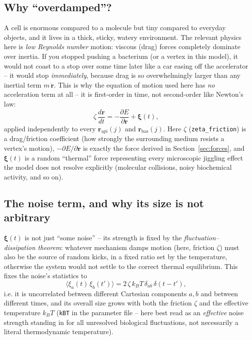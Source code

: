 \documentclass[11pt,a4paper]{report}
\newcommand{\rvec}{\mathbf{r}}
\begin{document}
\subsection{Why ``overdamped''?}
A cell is enormous compared to a molecule but tiny compared to
everyday objects, and it lives in a thick, sticky, watery environment.
The relevant physics here is \emph{low Reynolds number} motion: viscous
(drag) forces completely dominate over inertia. If you stopped pushing
a bacterium (or a vertex in this model), it would not coast to a stop
over some time later like a car easing off the accelerator -- it would
stop \emph{immediately}, because drag is so overwhelmingly larger than
any inertial term $m\,\ddot{\rvec}$. This is why the equation of motion
used here has \emph{no} acceleration term at all -- it is first-order
in time, not second-order like Newton's law:
\begin{equation}
  \zeta \,\frac{d\rvec}{dt} = -\frac{\partial E}{\partial \rvec} + \boldsymbol{\xi}(t),
  \label{eq:langevin}
\end{equation}
applied independently to every $\rvec_{\mathrm{api}}(j)$ and
$\rvec_{\mathrm{bas}}(j)$. Here $\zeta$ (\texttt{zeta\_friction}) is a
drag/friction coefficient (how strongly the surrounding medium resists
a vertex's motion), $-\partial E/\partial\rvec$ is exactly the force
derived in Section~\ref{sec:forces}, and $\boldsymbol\xi(t)$ is a
random ``thermal'' force representing every microscopic jiggling
effect the model does not resolve explicitly (molecular collisions,
noisy biochemical activity, and so on).

\subsection{The noise term, and why its size is not arbitrary}
$\boldsymbol\xi(t)$ is not just ``some noise'' -- its strength is fixed
by the \emph{fluctuation--dissipation theorem}: whatever mechanism
damps motion (here, friction $\zeta$) must also be the source of
random kicks, in a fixed ratio set by the temperature, otherwise the
system would not settle to the correct thermal equilibrium. This fixes
the noise's statistics to
\begin{equation}
  \langle \xi_a(t)\,\xi_b(t')\rangle = 2\,\zeta\, k_BT\, \delta_{ab}\,\delta(t-t'),
\end{equation}
i.e. it is uncorrelated between different Cartesian components $a,b$
and between different times, and its overall size grows with both the
friction $\zeta$ and the effective temperature $k_BT$
(\texttt{kBT} in the parameter file -- here best read as an
\emph{effective} noise strength standing in for all unresolved
biological fluctuations, not necessarily a literal thermodynamic
temperature).
\end{document}

